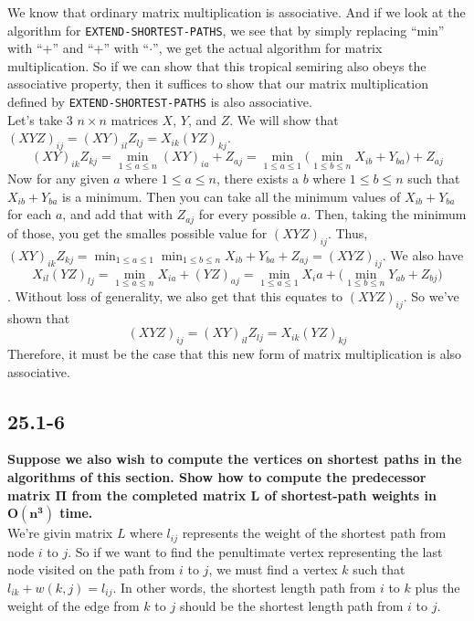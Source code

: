 \documentclass[11pt]{article}
\begin{document}
 We know that ordinary matrix multiplication is associative.  And if we look at the algorithm for 
 \texttt{EXTEND-SHORTEST-PATHS}, we see that by simply replacing ``min'' with ``+'' and ``+'' with 
 ``\(\cdot\)'', we get the actual algorithm for matrix multiplication.  So if we can show that this 
 tropical semiring also obeys the associative property, then it suffices to show that our matrix 
 multiplication defined by \texttt{EXTEND-SHORTEST-PATHS} is also associative. \\

 Let's take 3 \(n \times n\) matrices \(X\), \(Y\), and \(Z\).  We will show that 
 \((XYZ)_{ij} = (XY)_{il}Z_{lj} = X_{ik}(YZ)_{kj}\). 
  \[(XY)_{ik}Z_{kj} = \min_{1 \leq a \leq n} (XY)_{ia} + Z_{aj} = \min_{1 \leq a \leq 1} 
  \Big(\min_{1 \leq b \leq n} X_{ib} + Y_{ba}\Big) + Z_{aj}\]
  Now for any given \(a\) where \(1 \leq a \leq n\), there exists a \(b\) where \(1 \leq b \leq n\) 
  such that \(X_{ib} + Y_{ba}\) is a minimum.  Then you can take all the minimum values of 
  \(X_{ib} + Y_{ba}\) for each \(a\), and add that with \(Z_{aj}\) for every possible \(a\).  Then, 
  taking the minimum of those, you get the smalles possible value for \((XYZ)_{ij}\).  Thus, 
  \((XY)_{ik}Z_{kj} = \displaystyle\min_{1 \leq a \leq 1} 
  \displaystyle\min_{1 \leq b \leq n} X_{ib} + Y_{ba} + Z_{aj} = (XYZ)_{ij}\). We also have 
  \[X_{il}(YZ)_{lj} = \min_{1 \leq a \leq n} X_{ia} + (YZ)_{aj} = \min_{1 \leq a \leq 1} 
  X_ia + \Big(\min_{1 \leq b \leq n} Y_{ab} + Z_{bj}\Big)\]. 
  Without loss of generality, we also get that this equates to \((XYZ)_{ij}\).  So we've shown that 
  \[(XYZ)_{ij} = (XY)_{il}Z_{lj} = X_{ik}(YZ)_{kj}\]
  Therefore, it must be the case that this new form of matrix multiplication is also associative.
 \newpage

 \subsection*{25.1-6}
 \textbf{Suppose we also wish to compute the vertices on shortest paths in the algorithms of this 
 section. Show how to compute the predecessor matrix \(\mathbf{\Pi}\) from the completed matrix 
 \(\mathbf{L}\) of shortest-path weights in \(\mathbf{O(n^3)}\) time.} \\

 We're givin matrix \(L\) where \(l_{ij}\) represents the weight of the shortest path from node 
 \(i\) to \(j\).  So if we want to find the penultimate vertex representing the last node visited 
 on the path from \(i\) to \(j\), we must find a vertex \(k\) such that \(l_{ik} + w(k,j) = l_{ij}\).
 In other words, the shortest length path from \(i\) to \(k\) plus the weight of the edge from \(k\) 
 to \(j\) should be the shortest length path from \(i\) to \(j\). \\ 
\end{document}
